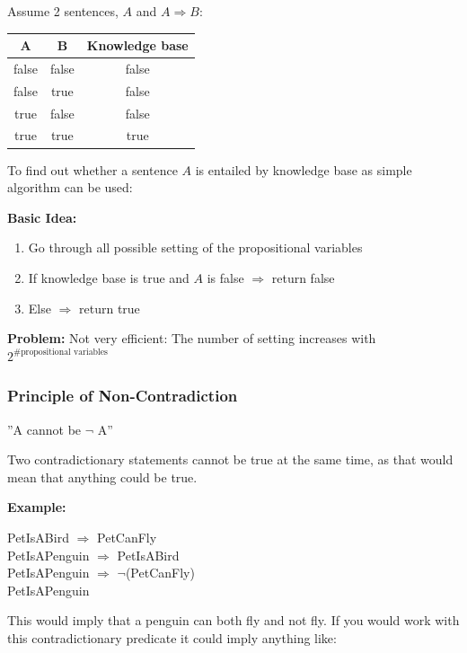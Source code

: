 \documentclass[
../../EiKI_Summary.tex,
]
{subfiles}
\begin{document}
Assume 2 sentences, $A$ and $A \Rightarrow B$:

\begin{center}
	\begin{tabular}{|c|c|c|}
        \hline
        A & B & Knowledge base \\
        \hline\hline
        false & false & false \\
        false & true & false \\
        true & false & false \\
        true & true & true \\
        \hline
    \end{tabular}
\end{center}

To find out whether a sentence $A$ is entailed by knowledge base as simple algorithm can be used:

\textbf{Basic Idea:}
\begin{enumerate}
    \item Go through all possible setting of the propositional variables
    \item If knowledge base is true and $A$ is false $\Rightarrow$ return false
    \item Else $\Rightarrow$ return true
\end{enumerate}

\textbf{Problem:}
Not very efficient: The number of setting increases with $2^{\text{\# propositional variables}}$

\subsubsection{Principle of Non-Contradiction}
\begin{defbox*}
    \begin{center}
	''A cannot be $\neg$ A''
    \end{center}

    Two contradictionary statements cannot be true at the same time, as that would mean that anything could be true.
\end{defbox*}

\textbf{Example:}

PetIsABird $\Rightarrow$ PetCanFly\\
PetIsAPenguin $\Rightarrow$ PetIsABird\\
PetIsAPenguin $\Rightarrow$ $\neg$(PetCanFly)\\
PetIsAPenguin

This would imply that a penguin can both fly and not fly. If you would work with this contradictionary predicate it could imply anything like:
\end{document}
